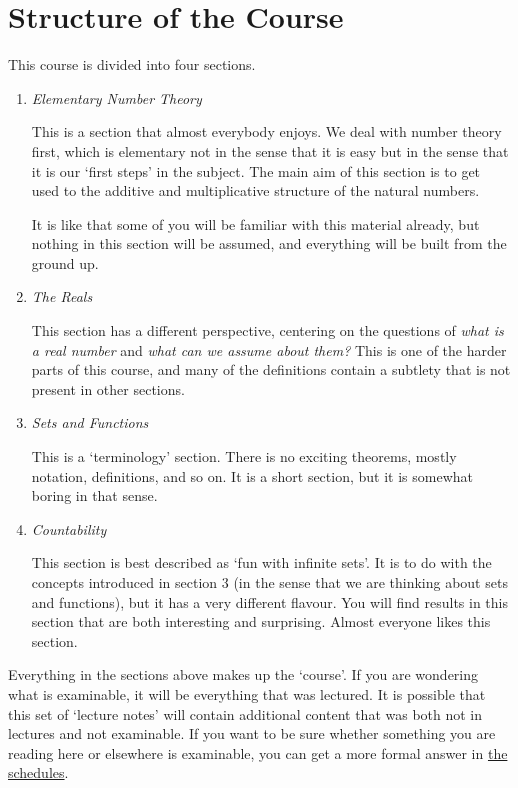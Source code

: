 \documentclass[a4paper]{scrreprt}
\begin{document}
\section{Structure of the Course}

This course is divided into four sections.

\begin{enumerate}
	\item \emph{Elementary Number Theory}
	
	This is a section that almost everybody enjoys. 
	We deal with number theory first, which is elementary not in the sense that it is easy but in the sense that it is our `first steps' in the subject. The main aim of this section is to get used to the additive and multiplicative structure of the natural numbers.

	It is like that some of you will be familiar with this material already, but nothing in this section will be assumed, and everything will be built from the ground up.

	\item \emph{The Reals}
	
	This section has a different perspective, centering on the questions of \emph{what is a real number} and \emph{what can we assume about them?} This is one of the harder parts of this course, and many of the definitions contain a subtlety that is not present in other sections. 

	\item \emph{Sets and Functions}
	
	This is a `terminology' section. There is no exciting theorems, mostly notation, definitions, and so on. It is a short section, but it is somewhat boring in that sense.

	\item \emph{Countability}
	
	This section is best described as `fun with infinite sets'. It is to do with the concepts introduced in section 3 (in the sense that we are thinking about sets and functions), but it has a very different flavour. You will find results in this section that are both interesting and surprising. Almost everyone likes this section.
\end{enumerate}

Everything in the sections above makes up the `course'. If you are wondering what is examinable, it will be everything that was lectured. It is possible that this set of `lecture notes' will contain additional content that was both not in lectures and not examinable. If you want to be sure whether something you are reading here or elsewhere is examinable, you can get a more formal answer in \href{https://www.maths.cam.ac.uk/undergrad/files/schedules.pdf}{the schedules}.
\end{document}
